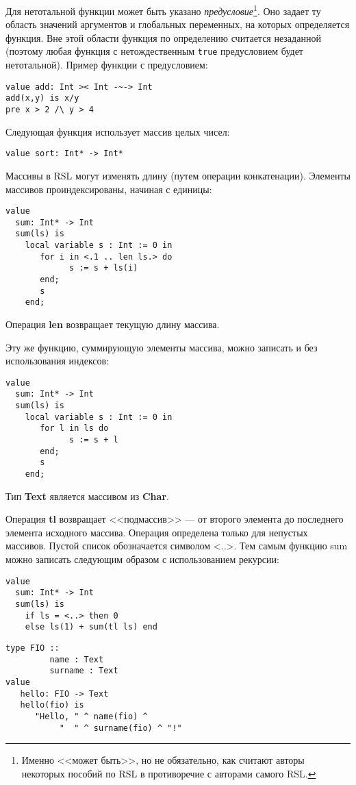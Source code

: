 Для нетотальной функции может быть указано \emph{предусловие}\footnote{Именно <<может быть>>, но не обязательно, как считают авторы некоторых пособий по RSL в противоречие с авторами самого RSL.}. Оно задает ту область значений аргументов и глобальных переменных, на которых определяется функция. Вне этой области функция по определению считается незаданной (поэтому любая функция с нетождественным \texttt{true} предусловием будет нетотальной). Пример функции с предусловием:
\begin{lstlisting}
value add: Int >< Int -~-> Int
add(x,y) is x/y
pre x > 2 /\ y > 4
\end{lstlisting}


Следующая функция использует массив целых чисел:
\begin{lstlisting}
value sort: Int* -> Int*
\end{lstlisting}

Массивы в RSL могут изменять длину (путем операции конкатенации). Элементы массивов проиндексированы, начиная с единицы:
\begin{lstlisting}
value
  sum: Int* -> Int
  sum(ls) is
    local variable s : Int := 0 in
       for i in <.1 .. len ls.> do
             s := s + ls(i)
       end;
       s
    end;
\end{lstlisting}

Операция \textbf{len} возвращает текущую длину массива.

Эту же функцию, суммирующую элементы массива, можно записать и без использования индексов:
\begin{lstlisting}
value
  sum: Int* -> Int
  sum(ls) is
    local variable s : Int := 0 in
       for l in ls do
             s := s + l
       end;
       s
    end;
\end{lstlisting}

Тип \textbf{Text} является массивом из \textbf{Char}.

Операция \textbf{tl} возвращает <<подмассив>> --- от второго элемента до последнего элемента исходного массива. Операция определена только для непустых массивов. Пустой список обозначается символом <..>. Тем самым функцию sum можно записать следующим образом с использованием рекурсии:
\begin{lstlisting}
value
  sum: Int* -> Int
  sum(ls) is
    if ls = <..> then 0
    else ls(1) + sum(tl ls) end
\end{lstlisting}


\begin{lstlisting}
type FIO ::
         name : Text
         surname : Text
value
   hello: FIO -> Text
   hello(fio) is
      "Hello, " ^ name(fio) ^
           "  " ^ surname(fio) ^ "!"
\end{lstlisting}

